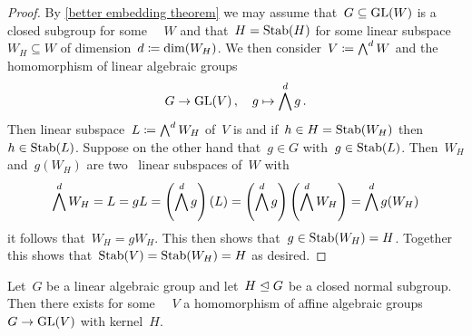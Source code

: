 \begin{proof}
  By \cref{better embedding theorem} we may assume that~$G \subseteq \operatorname{GL}(W)$ is a closed subgroup for some ~~$W$ and that~$H = \operatorname{Stab}(H)$ for some linear subspace~$W_H \subseteq W$ of dimension~$d \coloneqq \dim(W_H)$.
  We then consider~$V \coloneqq \bigwedge^d W$ and the homomorphism of linear algebraic groups
  \[
            G
    \to     \operatorname{GL}(V) \,,
    \quad   g
    \mapsto \bigwedge^d g \,.
  \]
  Then linear subspace~$L \coloneqq \bigwedge^d W_H$ of~$V$ is  and if~$h \in H =  \operatorname{Stab}(W_H)$ then~$h \in \operatorname{Stab}(L)$.
  Suppose on the other hand that~$g \in G$ with~$g \in \operatorname{Stab}(L)$.
  Then~$W_H$ and~$g(W_H)$ are two~ linear subspaces of~$W$ with
  \[
      \bigwedge^d W_H
    = L
    = g L
    = \left( \bigwedge^d g \right)(L)
    = \left( \bigwedge^d g \right) \left( \bigwedge^d W_H \right)
   =  \bigwedge^d g(W_H)
  \]
  it follows that~$W_H = g W_H$.
  This then shows that~$g \in \operatorname{Stab}(W_H) = H$.
  Together this shows that~$\operatorname{Stab}(V) = \operatorname{Stab}(W_H) = H$ as desired.
\end{proof}


\begin{proposition}
  Let~$G$ be a linear algebraic group and let~$H \trianglelefteq G$ be a closed normal subgroup.
  Then there exists for some ~~$V$ a homomorphism of affine algebraic groups~$G \to \operatorname{GL}(V)$ with kernel~$H$.
\end{proposition}


